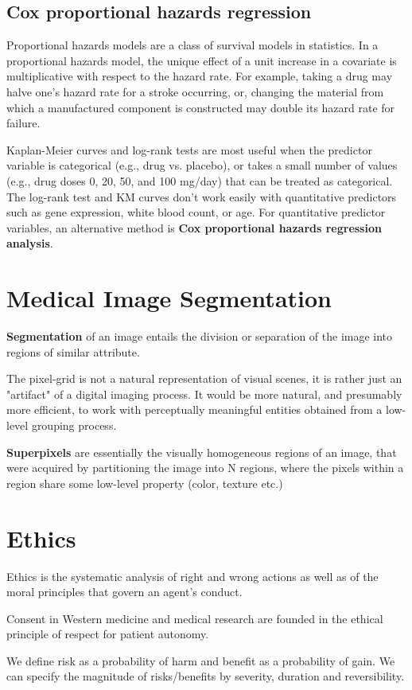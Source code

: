 \documentclass[12pt]{article}
\begin{document}
\subsection{Cox proportional hazards regression}
\par Proportional hazards models are a class of survival models in statistics. In a proportional hazards model, the unique effect of a unit increase in a covariate is multiplicative with respect to the hazard rate. For example, taking a drug may halve one's hazard rate for a stroke occurring, or, changing the material from which a manufactured component is constructed may double its hazard rate for failure.
\par Kaplan-Meier curves and log-rank tests are most useful when the predictor variable is categorical (e.g., drug vs. placebo), or takes a small number of values (e.g., drug doses 0, 20, 50, and 100 mg/day) that can be treated as categorical. The log-rank test and KM curves don't work easily with quantitative predictors such as gene expression, white blood count, or age. For quantitative predictor variables, an alternative method is \textbf{Cox proportional hazards regression analysis}.

\section{Medical Image Segmentation}
\par \textbf{Segmentation} of an image entails the division or separation of the image into regions of similar attribute.
\par The pixel-grid is not a natural representation of visual scenes, it is rather just an "artifact" of a digital imaging process. It would be more natural, and presumably more efficient, to work with perceptually meaningful entities obtained from a low-level grouping process.
\par \textbf{Superpixels} are essentially the visually homogeneous regions of an image, that were acquired by partitioning the image into N regions, where the pixels within a region share some low-level property (color, texture etc.)

\section{Ethics}
\par Ethics is the systematic analysis of right and wrong actions as well as of the moral principles that govern an agent's conduct.
\par Consent in Western medicine and medical research are founded in the ethical principle of respect for patient autonomy.
\par We define risk as a probability of harm and benefit as a probability of gain. We can specify the magnitude of risks/benefits by severity, duration and reversibility.\\
\end{document}
